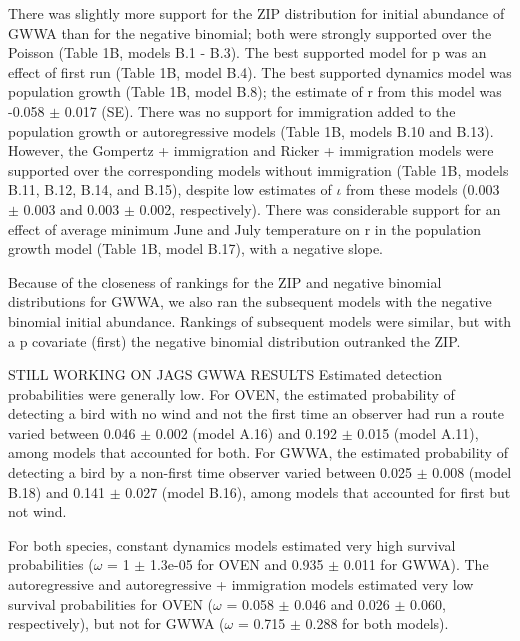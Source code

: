 \documentclass[12pt]{article}
\begin{document}
There was slightly more support for the ZIP distribution for initial
abundance of GWWA than for the negative binomial; both were strongly
supported over the Poisson (Table 1B, models B.1 - B.3).  The best
supported model for p was an effect of first run (Table 1B, model
B.4).  The best supported dynamics model was population growth (Table
1B, model B.8); the estimate of r from this model was -0.058 $\pm$ 0.017
(SE).  There was no support for immigration added to the population
growth or autoregressive models (Table 1B, models B.10 and B.13).
However, the Gompertz + immigration and Ricker + immigration models
were supported over the corresponding models without immigration
(Table 1B, models B.11, B.12, B.14, and B.15), despite low estimates
of $\iota$ from these models (0.003 $\pm$ 0.003 and 0.003 $\pm$ 0.002,
respectively).  There was considerable support for an effect of
average minimum June and July temperature on r in the population
growth model (Table 1B, model B.17), with a negative slope.

Because of the closeness of rankings for the ZIP and negative binomial
distributions for GWWA, we also ran the subsequent models with the
negative binomial initial abundance.  Rankings of subsequent models
were similar, but with a p covariate (first) the negative binomial
distribution outranked the ZIP.

STILL WORKING ON JAGS GWWA RESULTS
Estimated detection probabilities were generally low.  For OVEN, the
estimated probability of detecting a bird with no wind and not the
first time an observer had run a route varied between 0.046 $\pm$ 0.002
(model A.16) and 0.192 $\pm$ 0.015 (model A.11), among models that
accounted for both.  For GWWA, the estimated probability of detecting
a bird by a non-first time observer varied between 0.025 $\pm$ 0.008
(model B.18) and 0.141 $\pm$ 0.027 (model B.16), among models that
accounted for first but not wind.

For both species, constant dynamics models estimated very high
survival probabilities ($\omega$ = 1 $\pm$ 1.3e-05 for OVEN and 0.935 $\pm$ 0.011 for
GWWA).   The autoregressive and autoregressive + immigration models
estimated very low survival probabilities for OVEN ($\omega$ = 0.058 $\pm$ 0.046
and 0.026 $\pm$ 0.060, respectively), but not for GWWA ($\omega$ = 0.715 $\pm$ 0.288
for both models).
\end{document}
